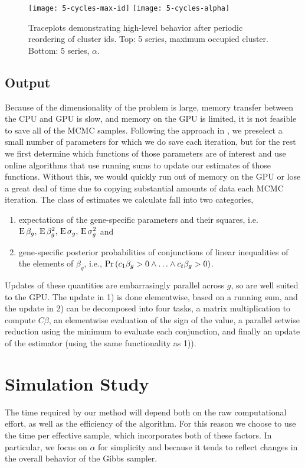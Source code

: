 \begin{figure}
\texttt{[image: 5-cycles-max-id]}
\texttt{[image: 5-cycles-alpha]}
\caption{Traceplots demonstrating high-level behavior after periodic reordering of cluster ids. Top: 5 series, maximum occupied cluster. Bottom: 5 series, $\alpha$.}
\label{fig:max-id}
\end{figure}


\subsection{Output}
\label{subsec:output}
Because of the dimensionality of the problem is large, memory transfer between the CPU and GPU is slow, and memory on the GPU is limited, it is not feasible to save all of the MCMC samples. Following the approach in \citet{landau2016fully}, we preselect a small number of parameters for which we do save each iteration, but for the rest we first determine which functions of those parameters are of interest and use online algorithms that use running sums to update our estimates of those functions. Without this, we would quickly run out of memory on the GPU or lose a great deal of time due to copying substantial amounts of data each MCMC iteration. The class of estimates we calculate fall into two categories,
\begin{enumerate}
\item expectations of the gene-specific parameters and their squares, i.e. $\operatorname{E} \beta_g,\, \operatorname{E} \beta_g^2,\, \operatorname{E}\sigma_g,\, \operatorname{E}\sigma_g^2$ and 
\item gene-specific posterior probabilities of conjunctions of linear
  inequalities of the elements of $\beta_g$, i.e.,
  $\operatorname{Pr}\left(c_1\beta_g > 0 \land \ldots \land c_t\beta_g > 0\right)$.
\end{enumerate}
Updates of these quantities are embarrasingly parallel across $g$, so are well suited to the GPU. The update in 1) is done elementwise, based on a running sum, and the update in 2) can be decomposed into four tasks, a matrix multiplication to compute $C\beta$, an elementwise evaluation of the sign of the value, a parallel setwise reduction using the minimum to evaluate each conjunction, and finally an update of the estimator (using the same functionality as 1)).

\section{Simulation Study}
The time required by our method will depend both on the raw computational effort, as well as the efficiency of the algorithm. For this reason we choose to use the time per effective sample, which incorporates both of these factors. In particular, we focus on $\alpha$ for simplicity and because it tends to reflect changes in the overall behavior of the Gibbs sampler.

